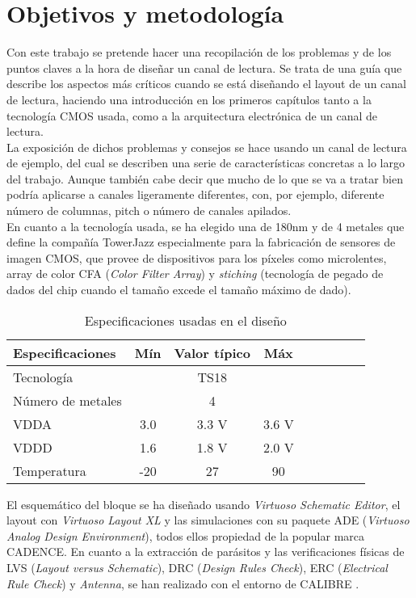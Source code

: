 \chapter*{Objetivos y metodología}
\label{cap:objetivos}

Con este trabajo se pretende hacer una recopilación de los problemas y de los
puntos claves a la hora de diseñar un canal de lectura. Se trata de una guía
que describe los aspectos más críticos cuando se está diseñando el layout de un
canal de lectura, haciendo una introducción en los primeros capítulos tanto a
la tecnología CMOS usada, como a la arquitectura electrónica de un canal de lectura.\\

La exposición de dichos problemas y consejos se hace usando un canal de lectura
de ejemplo, del cual se describen una serie de características concretas a lo
largo del trabajo. Aunque también cabe decir que mucho de lo que se va a tratar
bien podría aplicarse a canales ligeramente diferentes, con, por ejemplo,
diferente número de columnas, pitch o número de canales apilados.\\

En cuanto a la tecnología usada, se ha elegido una de 180nm y de 4 metales que
define la compañía TowerJazz\textsuperscript{\textregistered} especialmente para la fabricación de
sensores de imagen CMOS\cite{TowerJazz}, que provee de dispositivos para los
píxeles como microlentes, array de color CFA (\textit{Color Filter Array}) y \textit{stiching}
(tecnología de pegado de dados del chip cuando el tamaño excede el tamaño máximo
de dado).\\

\renewcommand{\tablename}{Tabla}

\begin{table}[h]
	\centering
	\caption{Especificaciones usadas en el diseño}
	\label{table:specifications}
	\begin{tabular}{l*{7}{c}r}
		\hline
		Especificaciones	& Mín & Valor típico & Máx \\
		\hline
		Tecnología		&  & TS18 & \\
		Número de metales	&  & 4 & \\
		VDDA			& 3.0 & 3.3 V & 3.6 V \\
		VDDD 			& 1.6 & 1.8 V & 2.0 V \\
		Temperatura		& -20\centigrade & 27\centigrade & 90\centigrade \\
		\hline
	\end{tabular}
\end{table}

El esquemático del bloque se ha diseñado usando \textit{Virtuoso Schematic Editor}\cite{VirtuosoSchematic},
el layout con \textit{Virtuoso Layout XL}\cite{VirtuosoLayoutXL} y las
simulaciones con su paquete ADE (\textit{Virtuoso Analog Design Environment}), todos
ellos propiedad de la popular marca CADENCE\textsuperscript{\textregistered}.
En cuanto a la extracción de parásitos y las verificaciones físicas de LVS
(\textit{Layout versus Schematic}), DRC (\textit{Design Rules Check}), ERC
(\textit{Electrical Rule Check}) y \textit{Antenna}, se han realizado con el entorno
de CALIBRE\textsuperscript{\textregistered} \cite{Calibre}.
